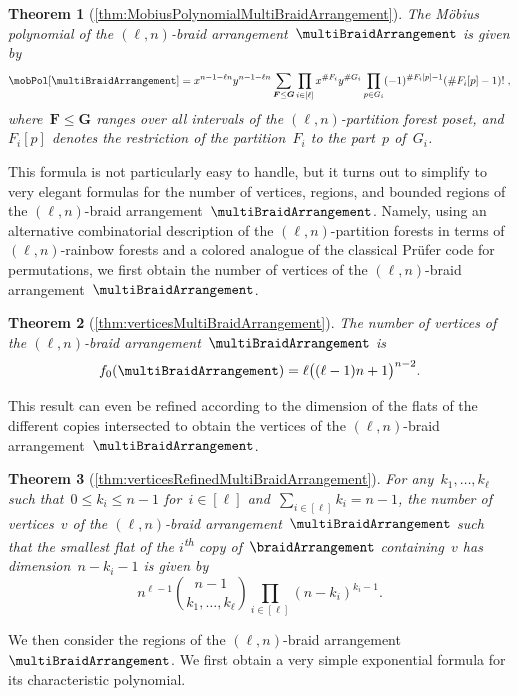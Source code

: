 \documentclass{amsart}
\newtheorem*{theorem*}{Theorem}
\theoremstyle{definition}
\renewcommand{\b}[1]{{\boldsymbol{#1}}} %
\newcommand{\card}[1]{\##1} %
\newcommand{\ordinal}{\textsuperscript{th}} %
\renewcommand{\b}[1]{\boldsymbol{#1}} %
\begin{document}
\begin{theorem*}[\cref{thm:MobiusPolynomialMultiBraidArrangement}]
The M\"obius polynomial of the $(\ell,n)$-braid arrangement~$\multiBraidArrangement$ is given by
\[
\mobPol[\multiBraidArrangement] = x^{n-1-\ell n} y^{n-1-\ell n} \sum_{\b{F} \le \b{G}} \prod_{i \in [\ell]} x^{\card{F_i}} y^{\card{G_i}} \prod_{p \in G_i} (-1)^{\card{F_i[p]}-1} (\card{F_i[p]}-1)! \; ,
\]
where~$\b{F} \le \b{G}$ ranges over all intervals of the $(\ell,n)$-partition forest poset, and~$F_i[p]$ denotes the restriction of the partition~$F_i$ to the part~$p$ of~$G_i$.
\end{theorem*}

This formula is not particularly easy to handle, but it turns out to simplify to very elegant formulas for the number of vertices, regions, and bounded regions of the $(\ell,n)$-braid arrangement~$\multiBraidArrangement$.
Namely, using an alternative combinatorial description of the $(\ell,n)$-partition forests in terms of $(\ell, n)$-rainbow forests and a colored analogue of the classical Pr\"ufer code for permutations, we first obtain the number of vertices of the $(\ell,n)$-braid arrangement~$\multiBraidArrangement$.

\begin{theorem*}[\cref{thm:verticesMultiBraidArrangement}]
The number of vertices of the $(\ell,n)$-braid arrangement~$\multiBraidArrangement$ is
\[
f_0(\multiBraidArrangement) = \ell \big( (\ell-1) n + 1 \big)^{n-2}.
\]
\end{theorem*}

This result can even be refined according to the dimension of the flats of the different copies intersected to obtain the vertices of the $(\ell,n)$-braid arrangement~$\multiBraidArrangement$.

\begin{theorem*}[\cref{thm:verticesRefinedMultiBraidArrangement}]
For any~$k_1, \dots, k_\ell$ such that~$0 \le k_i \le n-1$ for~$i \in [\ell]$ and~${\sum_{i \in [\ell]} k_i = n-1}$, the number of vertices~$v$ of the $(\ell,n)$-braid arrangement~$\multiBraidArrangement$ such that the smallest flat of the $i$\ordinal{} copy of~$\braidArrangement$ containing~$v$ has dimension~$n-k_i-1$ is given by
\[
n^{\ell-1} \binom{n-1}{k_1, \dots, k_\ell} \prod_{i \in [\ell]} (n-k_i)^{k_i-1}.
\]
\end{theorem*}

We then consider the regions of the $(\ell,n)$-braid arrangement~$\multiBraidArrangement$.
We first obtain a very simple exponential formula for its characteristic polynomial.
\end{document}
